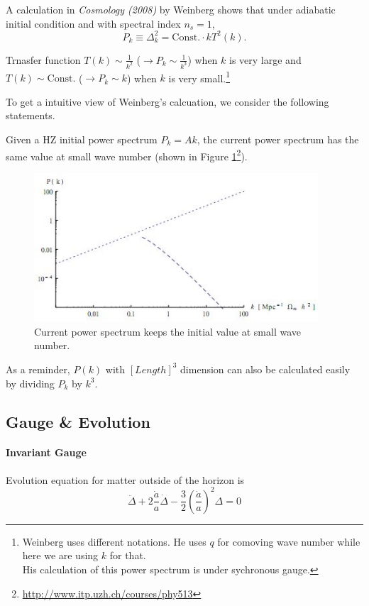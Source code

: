 \documentclass{article}
\begin{document}
A calculation in {\it Cosmology (2008)} by Weinberg shows that under adiabatic initial condition and with spectral index $n_s=1$,
$$P_k\equiv \Delta^2_k={\text{Const.}}\cdot k T^2(k).$$

Trnasfer function $T(k)\sim \frac{1}{k^2}$ ($\rightarrow P_k\sim \frac{1}{k^3}$) when $k$ is very large and $T(k)\sim {\text{Const.}}$ ($\rightarrow P_k\sim k$) when $k$ is very small.{\footnote{Weinberg uses different notations. He uses $q$ for comoving wave number while here we are using $k$ for that. \\ His calculation of this power spectrum is under sychronous gauge.}}

To get a intuitive view of Weinberg's calcuation, we consider the following statements. 

Given a HZ initial power spectrum $P_k=Ak$, the current power spectrum has the same value at small wave number (shown in Figure \ref{fig:powerspectrum1}{\footnote{\url{http://www.itp.uzh.ch/courses/phy513}}}).
\begin{figure}[!htpb]
\centering
\includegraphics[width=300pt]{PowerSpectrum_CDM.jpg}
\caption{Current power spectrum keeps the initial value at small wave number.}\label{fig:powerspectrum1}
\end{figure}

 


As a reminder, $P(k)$ with $[Length]^3$ dimension can also be calculated easily by dividing $P_k$ by $k^3$.


\iffalse
\subsection{Gauge \& Evolution}

\paragraph{Invariant Gauge}

Evolution equation for matter outside of the horizon is
\[\ddot\Delta+2\frac{\dot a}{a}\dot\Delta-\frac 3 2 \left(\frac {\dot a}{a}\right)^2\Delta=0\]
\end{document}
